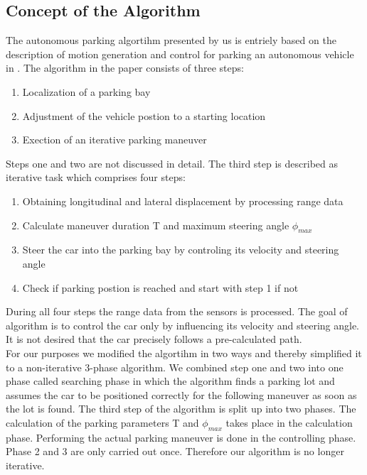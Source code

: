 \documentclass[paper=a4, fontsize=11pt]{scrreprt}
\begin{document}
\subsection{Concept of the Algorithm}
The autonomous parking algortihm presented by us is entriely based on the description of motion generation and control for parking an autonomous vehicle in \cite{mgcpav}. The algorithm in the paper consists of three steps: 
\begin{enumerate}
	\item Localization of a parking bay
	\item Adjustment of the vehicle postion to a starting location
	\item Exection of an iterative parking maneuver
\end{enumerate}
Steps one and two are not discussed in detail. The third step is described as iterative task which comprises four steps:
\begin{enumerate}
	\item Obtaining longitudinal and lateral displacement by processing range data
	\item Calculate maneuver duration T and maximum steering angle $\phi_{max}$
	\item Steer the car into the parking bay by controling its velocity and steering angle
	\item Check if parking postion is reached and start with step 1 if not
\end{enumerate}
During all four steps the range data from the sensors is processed. The goal of algorithm is to control the car only by influencing its velocity and steering angle. It is not desired that the car precisely follows a pre-calculated path.\\
For our purposes we modified the algortihm in two ways and thereby simplified it to a non-iterative 3-phase algorithm. We combined step one and two into one phase called searching phase in which the algorithm finds a parking lot and assumes the car to be positioned correctly for the following maneuver as soon as the lot is found. The third step of the algorithm is split up into two phases. The calculation of the parking parameters T and $\phi_{max}$ takes place in the calculation phase. Performing the actual parking maneuver is done in the controlling phase. Phase 2 and 3 are only carried out once. Therefore our algorithm is no longer iterative.
\end{document}
